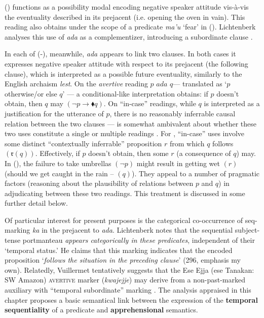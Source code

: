 () functions as a possibility modal encoding negative speaker attitude vis-à-vis the eventuality described in its prejacent (i.e. opening the oven in vain). This reading also obtains under the scope of a predicate \textit{ma'u} `fear' in (). Lichtenberk analyses this use of \textit{ada} as a complementizer, introducing a subordinate clause \citeyearpar[296]{Lichtenberk1995}. 

In each of (-), meanwhile, \textit{ada} appears to link two clauses. In both cases it expresses negative speaker attitude with respect to its prejacent (the following clause), which is interpreted as a possible future eventuality, similarly to the English archaism \textit{lest}. On the \textit{avertive} reading $ p \textit{ ada } q$--- translated as `$ p $ otherwise/or else $ q $' --- a condi\-tional-like interpretation obtains: if $ p $ doesn't obtain, then $ q $ may $ (\neg p \to\blacklozenge q) $. On ``in-case'' readings, while $ q $ is interpreted as a justification for the utterance of $ p $, there is no reasonably inferrable causal relation between the two clauses --- \citeauthor{Lichtenberk1995} is somewhat ambivalent about whether these two uses constitute a single or multiple readings \citeyearpar[298-302]{Lichtenberk1995}. For \citet{AnderBois2020}, ``in-case'' uses involve some distinct ``contextually inferrable'' proposition $ r $ from which $ q $ follows $ (\mathfrak{r}(q)) $. Effectively, if $ p$  doesn't obtain, then some $ r $ (a consequence of $ q $) may. In (), the failure to take umbrellas $( \neg p) $ might result in getting wet $ (r) $ (should we get caught in the rain -- $ (q) $). They appeal to a number of pragmatic factors (reasoning about the plausibility of relations between $ p $ and $ q $) in adjudicating between these two readings. This treatment is discussed in some further detail below.

 Of particular interest for present purposes is the categorical co-occurrence of {\sc seq}-marking \textit{ka} in the prejacent to \textit{ada}. Lichtenberk notes that the sequential subject-tense portmanteau \textit{appears categorically in these predicates}, independent of their `temporal status.' He claims that this marking indicates that the encoded proposition `\textit{follows the situation in the preceding clause}' (296, emphasis my own). Relatedly, Vuillermet tentatively suggests that the Ese Ejja (\gls{ese} Tanakan: SW Amazon) \textsc{avertive} marker (\textit{kwajejje}) may derive from a non-past-marked auxiliary with ``temporal subordinate'' marking \citeyearpar[281]{Vuillermet2018}. The analysis appraised in this chapter proposes a basic semantical link between the expression of the \textbf{temporal sequentiality} of a predicate and \textbf{apprehensional} semantics.




